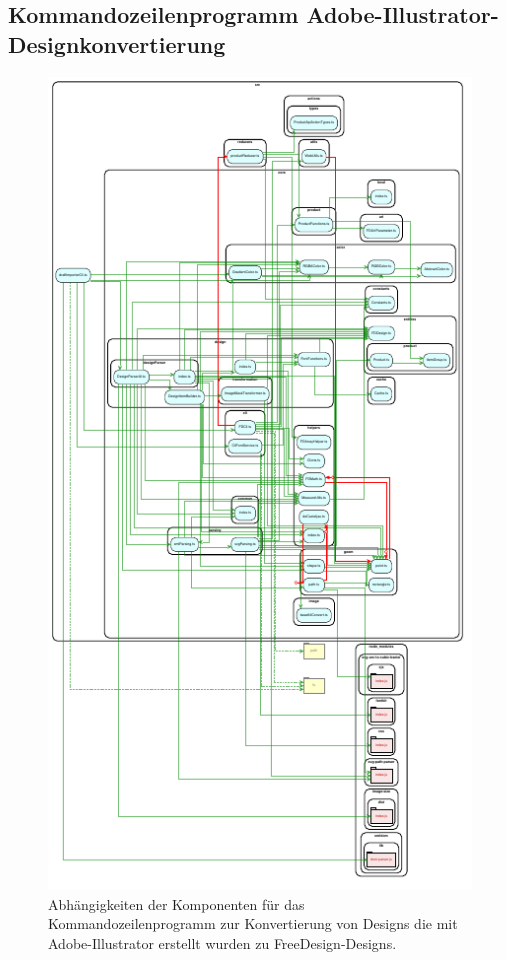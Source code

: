 \subsection{Kommandozeilenprogramm Adobe-Illustrator-Designkonvertierung}

\begin{figure}[H]
    \centering
    \includegraphics{diagrams/Ist-Architektur/draftImporter-analysis.pdf}
    \caption{Abhängigkeiten der Komponenten für das Kommandozeilenprogramm zur Konvertierung von Designs die mit Adobe-Illustrator erstellt wurden zu FreeDesign-Designs.}
    \label{fig:DesignImport}
\end{figure}

\begin{multicols}{2}    
    
\end{multicols}